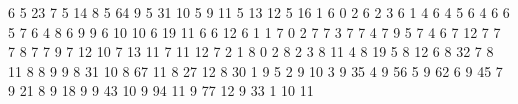 \documentclass[]{book}
\newenvironment{Shaded}{\begin{snugshade}}{\end{snugshade}}
\newcommand{\DecValTok}[1]{\textcolor[rgb]{0.00,0.00,0.81}{#1}}
\begin{document}
\begin{Shaded}
\begin{Highlighting}[]
\DecValTok{6}   \DecValTok{5}   \DecValTok{23}
\DecValTok{7}   \DecValTok{5}   \DecValTok{14}
\DecValTok{8}   \DecValTok{5}   \DecValTok{64}
\DecValTok{9}   \DecValTok{5}   \DecValTok{31}
\DecValTok{10}  \DecValTok{5}   \DecValTok{9}
\DecValTok{11}  \DecValTok{5}   \DecValTok{13}
\DecValTok{12}  \DecValTok{5}   \DecValTok{16}
\DecValTok{1}   \DecValTok{6}   \DecValTok{0}
\DecValTok{2}   \DecValTok{6}   \DecValTok{2}
\DecValTok{3}   \DecValTok{6}   \DecValTok{1}
\DecValTok{4}   \DecValTok{6}   \DecValTok{4}
\DecValTok{5}   \DecValTok{6}   \DecValTok{4}
\DecValTok{6}   \DecValTok{6}   \DecValTok{5}
\DecValTok{7}   \DecValTok{6}   \DecValTok{4}
\DecValTok{8}   \DecValTok{6}   \DecValTok{9}
\DecValTok{9}   \DecValTok{6}   \DecValTok{10}
\DecValTok{10}  \DecValTok{6}   \DecValTok{19}
\DecValTok{11}  \DecValTok{6}   \DecValTok{6}
\DecValTok{12}  \DecValTok{6}   \DecValTok{1}
\DecValTok{1}   \DecValTok{7}   \DecValTok{0}
\DecValTok{2}   \DecValTok{7}   \DecValTok{7}
\DecValTok{3}   \DecValTok{7}   \DecValTok{7}
\DecValTok{4}   \DecValTok{7}   \DecValTok{9}
\DecValTok{5}   \DecValTok{7}   \DecValTok{4}
\DecValTok{6}   \DecValTok{7}   \DecValTok{12}
\DecValTok{7}   \DecValTok{7}   \DecValTok{7}
\DecValTok{8}   \DecValTok{7}   \DecValTok{7}
\DecValTok{9}   \DecValTok{7}   \DecValTok{12}
\DecValTok{10}  \DecValTok{7}   \DecValTok{13}
\DecValTok{11}  \DecValTok{7}   \DecValTok{11}
\DecValTok{12}  \DecValTok{7}   \DecValTok{2}
\DecValTok{1}   \DecValTok{8}   \DecValTok{0}
\DecValTok{2}   \DecValTok{8}   \DecValTok{2}
\DecValTok{3}   \DecValTok{8}   \DecValTok{11}
\DecValTok{4}   \DecValTok{8}   \DecValTok{19}
\DecValTok{5}   \DecValTok{8}   \DecValTok{12}
\DecValTok{6}   \DecValTok{8}   \DecValTok{32}
\DecValTok{7}   \DecValTok{8}   \DecValTok{11}
\DecValTok{8}   \DecValTok{8}   \DecValTok{9}
\DecValTok{9}   \DecValTok{8}   \DecValTok{31}
\DecValTok{10}  \DecValTok{8}   \DecValTok{67}
\DecValTok{11}  \DecValTok{8}   \DecValTok{27}
\DecValTok{12}  \DecValTok{8}   \DecValTok{30}
\DecValTok{1}   \DecValTok{9}   \DecValTok{5}
\DecValTok{2}   \DecValTok{9}   \DecValTok{10}
\DecValTok{3}   \DecValTok{9}   \DecValTok{35}
\DecValTok{4}   \DecValTok{9}   \DecValTok{56}
\DecValTok{5}   \DecValTok{9}   \DecValTok{62}
\DecValTok{6}   \DecValTok{9}   \DecValTok{45}
\DecValTok{7}   \DecValTok{9}   \DecValTok{21}
\DecValTok{8}   \DecValTok{9}   \DecValTok{18}
\DecValTok{9}   \DecValTok{9}   \DecValTok{43}
\DecValTok{10}  \DecValTok{9}   \DecValTok{94}
\DecValTok{11}  \DecValTok{9}   \DecValTok{77}
\DecValTok{12}  \DecValTok{9}   \DecValTok{33}
\DecValTok{1}   \DecValTok{10}  \DecValTok{11}

\end{Highlighting}
\end{Shaded}
\end{document}
